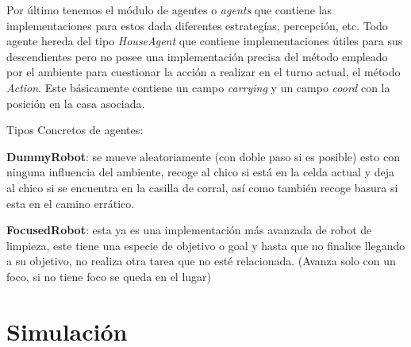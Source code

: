 \documentclass[a4paper,10pt,twocolumn]{article}
\begin{document}
 Por \'ultimo tenemos el m\'odulo de agentes o \textit{agents} que contiene las implementaciones para estos dada diferentes estrateg\'ias, percepci\'on, etc. Todo agente hereda del tipo \textit{HouseAgent} que contiene implementaciones \'utiles para sus descendientes pero no posee una implementaci\'on precisa del m\'etodo empleado por el ambiente para cuestionar la acci\'on a realizar en el turno actual, el m\'etodo \textit{Action}. Este b\'asicamente contiene un campo \textit{carrying} y un campo \textit{coord} con la posici\'on en la casa asociada.

 Tipos Concretos de agentes: 
 
 \textbf{DummyRobot}: se mueve aleatoriamente (con doble paso si es posible) esto con ninguna influencia del ambiente, recoge al chico si est\'a en la celda actual y deja al chico si se encuentra en la casilla de corral, as\'i como tambi\'en recoge basura si esta en el camino err\'atico.

 \textbf{FocusedRobot}: esta ya es una implementaci\'on m\'as avanzada de robot de limpieza, este tiene una especie de objetivo o goal y hasta que no finalice llegando a su objetivo, no realiza otra tarea que no est\'e relacionada. (Avanza solo con un foco, si no tiene foco se queda en el lugar)
 
\section{Simulación}
  	
\end{document}
